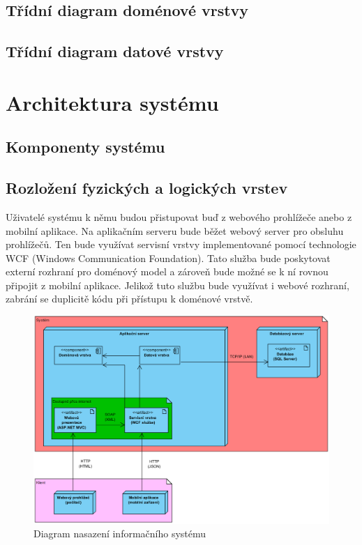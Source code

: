 \documentclass[a4paper,10pt,titlepage]{article}
\begin{document}
			\subsection{Třídní diagram doménové vrstvy}
				
			\subsection{Třídní diagram datové vrstvy}
				
		\section{Architektura systému}
			\subsection{Komponenty systému}
			
			\subsection{Rozložení fyzických a logických vrstev}
				Uživatelé systému k němu budou přistupovat buď z webového prohlížeče anebo z mobilní aplikace.
				Na aplikačním serveru bude běžet webový server pro obsluhu prohlížečů. Ten bude využívat servisní vrstvy
				implementované pomocí technologie WCF (Windows Communication Foundation). Tato služba bude poskytovat externí rozhraní
				pro doménový model a zároveň bude možné se k ní rovnou připojit z mobilní aplikace. Jelikož tuto službu bude využívat i webové rozhraní, zabrání
				se duplicitě kódu při přístupu k doménové vrstvě.
				\begin{figure}[H]
					\centering
							\includegraphics[width=\textwidth]{vis_deployment_diagram}
					\caption{Diagram nasazení informačního systému}
				\end{figure}	
			
\end{document}
